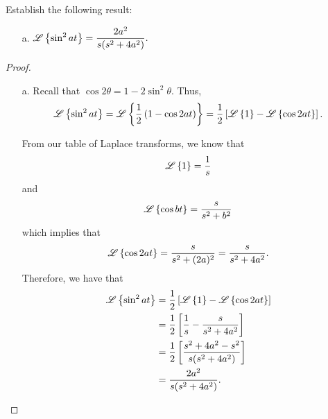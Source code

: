 \begin{problem}{3.18}
  Establish the following result:
  \begin{enumerate}
    \item[a.] $\displaystyle \mathscr{L}\left\{ {\sin^2 at} \right\} = \frac{2a^2}{s(s^2+4a^2)}.$
  \end{enumerate}
\end{problem}

\begin{proof}
  \begin{enumerate}
    \item[a.] Recall that $\cos 2\theta = 1 - 2\sin^2 \theta$. Thus,
      \begin{align*}
        \mathscr{L}\left\{ {\sin^2 at} \right\} = \mathscr{L}\left\{ {\frac{1}{2}\left(1 - \cos 2at \right)} \right\} = \frac{1}{2}\left[\mathscr{L}\left\{ {1} \right\} - \mathscr{L}\left\{ {\cos 2 at} \right\}\right].
      \end{align*}

      From our table of Laplace transforms, we know that
      \begin{align*}
        \mathscr{L}\left\{ {1} \right\} = \frac{1}{s}
      \end{align*}
      and
      \begin{align*}
        \mathscr{L}\left\{ {\cos b t} \right\} = \frac{s}{s^2 + b^2}
      \end{align*}
      which implies that
      \begin{align*}
        \mathscr{L}\left\{ {\cos 2 at} \right\} = \frac{s}{s^2 + (2a)^2} = \frac{s}{s^2 + 4a^2}.
      \end{align*}
      Therefore, we have that
      \begin{align*}
        \mathscr{L}\left\{ {\sin^2 at} \right\}
        &= \frac{1}{2}\left[\mathscr{L}\left\{ {1} \right\} - \mathscr{L}\left\{ {\cos 2 at} \right\}\right] \\
        &= \frac{1}{2}\left[\frac{1}{s} - \frac{s}{s^2+4a^2}\right] \\
        &= \frac{1}{2}\left[\frac{s^2 + 4a^2 - s^2}{s(s^2+4a^2)}\right] \\
        &= \frac{2a^2}{s(s^2 + 4a^2)}.
      \end{align*}
  \end{enumerate}
\end{proof}
\newpage
